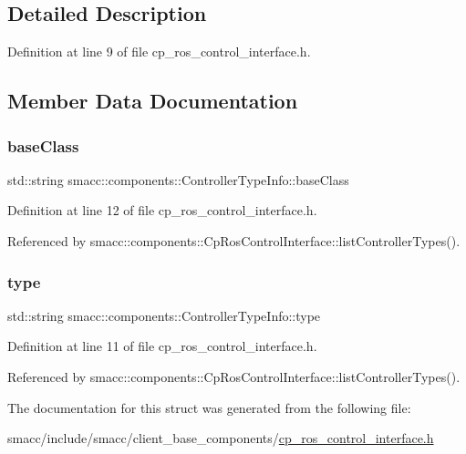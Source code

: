 \subsection{Detailed Description}


Definition at line 9 of file cp\+\_\+ros\+\_\+control\+\_\+interface.\+h.



\subsection{Member Data Documentation}
\mbox{\label{structsmacc_1_1components_1_1ControllerTypeInfo_a4506855fc728c39046bdb4f98a6a61f3}} 
\subsubsection{\texorpdfstring{base\+Class}{baseClass}}
{\footnotesize\ttfamily std\+::string smacc\+::components\+::\+Controller\+Type\+Info\+::base\+Class}



Definition at line 12 of file cp\+\_\+ros\+\_\+control\+\_\+interface.\+h.



Referenced by smacc\+::components\+::\+Cp\+Ros\+Control\+Interface\+::list\+Controller\+Types().

\mbox{\label{structsmacc_1_1components_1_1ControllerTypeInfo_a8b66de0e92b5b6b913d6b802a0495637}} 
\subsubsection{\texorpdfstring{type}{type}}
{\footnotesize\ttfamily std\+::string smacc\+::components\+::\+Controller\+Type\+Info\+::type}



Definition at line 11 of file cp\+\_\+ros\+\_\+control\+\_\+interface.\+h.



Referenced by smacc\+::components\+::\+Cp\+Ros\+Control\+Interface\+::list\+Controller\+Types().



The documentation for this struct was generated from the following file\+:\begin{DoxyCompactItemize}
\item 
smacc/include/smacc/client\+\_\+base\+\_\+components/\hyperlink{cp__ros__control__interface_8h}{cp\+\_\+ros\+\_\+control\+\_\+interface.\+h}\end{DoxyCompactItemize}
